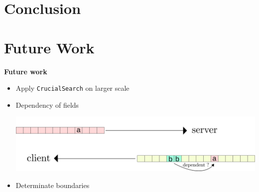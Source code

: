 \documentclass{beamer}
\newcounter{m} %
\newcounter{c} %
\begin{document}
\section{Conclusion}

%

\section{Future Work}


\begin{frame}{\bf Future work}

\begin{itemize}
    \item Apply \texttt{CrucialSearch} on larger scale
    \item Dependency of fields\\
    \begin{center}\includegraphics[scale=0.5]{relations.png}\end{center}
    \item Determinate boundaries
\end{itemize}
\end{frame}
\end{document}
